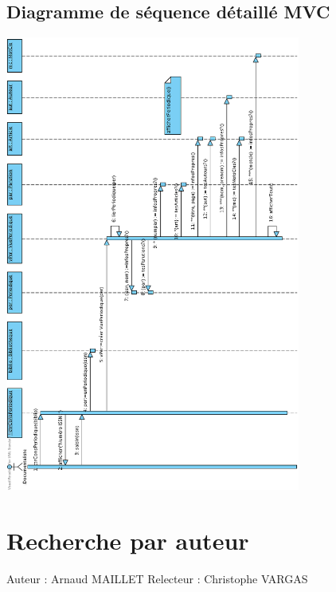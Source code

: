 \documentclass[a4paper,10pt]{report}
\begin{document}
\section*{Diagramme de séquence détaillé MVC}
\includegraphics[height=150mm]{ConsPeriodiqueMVC.png}

\newpage


\chapter*{Recherche par auteur}

Auteur : Arnaud MAILLET
Relecteur : Christophe VARGAS

\bigskip
\end{document}
